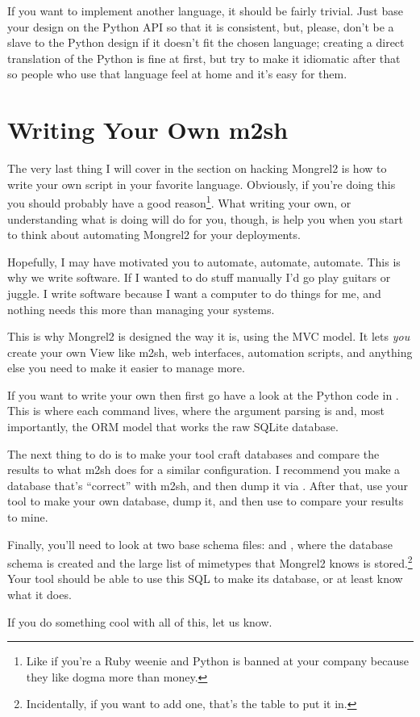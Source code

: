 If you want to implement another language, it should be fairly trivial.
Just base your design on the Python API so that it is consistent, but, please,
don't be a slave to the Python design if it doesn't fit the chosen language;
creating a direct translation of the Python is fine at first, but try
to make it idiomatic after that so people who use that language feel at
home and it's easy for them.


\section{Writing Your Own m2sh}

The very last thing I will cover in the section on hacking Mongrel2 is how to
write your own  script in your favorite language.  Obviously, if
you're doing this you should probably have a good reason\footnote{Like if
you're a Ruby weenie and Python is banned at your company because they like
dogma more than money.}.  What writing your own, or understanding what
 is doing will do for you, though, is help you when you start to
think about automating Mongrel2 for your deployments.

Hopefully, I may have motivated you to automate, automate, automate.
This is why we write software.  If I wanted to do stuff manually I'd
go play guitars or juggle.  I write software because I want a computer
to do things for me, and nothing needs this more than managing your systems.

This is why Mongrel2 is designed the way it is, using the MVC model.  It
lets \emph{you} create your own View like m2sh, web interfaces, automation
scripts, and anything else you need to make it easier to manage more.

If you want to write your own  then first go have a look at
the Python code in .  This is where each
command lives, where the argument parsing is and, most importantly, the
ORM model that works the raw SQLite database.

The next thing to do is to make your tool craft databases and compare the
results to what m2sh does for a similar configuration.  I recommend you make
a database that's ``correct'' with m2sh, and then dump it via .
After that, use your tool to make your own database, dump it, and then use
 to compare your results to mine.

Finally, you'll need to look at two base schema files:
 and , where
the database schema is created and the large list of mimetypes that
Mongrel2 knows is stored.\footnote{Incidentally, if you want to add one,
that's the table to put it in.}  Your tool should be able to use this
SQL to make its database, or at least know what it does.

If you do something cool with all of this, let us know.
